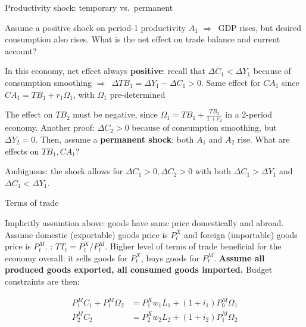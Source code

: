 \documentclass{beamer}
\newcommand{\tb}[1]{{\color{blue}{\textbf{#1}}}}
\newenvironment{mytemize}
{\vfill\itemize[nolistsep,itemsep=\fill,label=\color{blue}{$\triangleright$}]}
  {\enditemize}
\newcommand{\rarr}{$\Rightarrow$\ }
\begin{document}
\begin{frame}{%
\protect\hypertarget{productivity-shock-transitory-vs.permanent}{%
Productivity shock: temporary vs.~permanent}}

Assume a positive shock on period-1 productivity \(A_1\) \rarr GDP
rises, but desired consumption also rises. What is the net effect on
trade balance and current account?

\begin{mytemize}

\item
  In this economy, net effect always \textbf{positive}: recall that
  \(\Delta C_1 < \Delta Y_1\) because of consumption smoothing
  \rarr \(\Delta TB_1 = \Delta Y_1 - \Delta C_1 > 0\). Same effect for
  \(CA_1\) since \(CA_1 = TB_1 + r_1 \Omega_1\), with \(\Omega_1\)
  pre-determined
\item
  The effect on \(TB_2\) must be negative, since
  \(\Omega_1 = TB_1 + \frac{TB_2}{1+r_2}\) in a 2-period economy.
  Another proof: \(\Delta C_2 > 0\) because of consumption smoothing,
  but \(\Delta Y_2 = 0\).
\end{mytemize}
\vfill
Then, assume a \textbf{permanent shock}: both \(A_1\) and \(A_2\) rise.
What are effects on \(TB_1, CA_1\)?

\begin{mytemize}

\item
  Ambiguous: the shock allows for \(\Delta C_1 > 0, \Delta C_2 > 0\)
  with both \(\Delta C_1> \Delta Y_1\) and \(\Delta C_1< \Delta Y_1\).
\end{mytemize}

\end{frame}

\begin{frame}{%
\protect\hypertarget{terms-of-trade}{%
Terms of trade}}

Implicitly assumtion above: goods have same price
domestically and abroad. Assume domestic (exportable) goods price is \(P^X_t\)
 and foreign (importable) goods price is
\(P^M_t\).
\vfill
\tb{Terms of trade}:  \(TT_t = P^X_t/P^M_t\). Higher level
of terms of trade beneficial for the economy overall: it sells goods for
\(P^X_t\), buys goods for \(P^M_t\). \vfill \textbf{Assume all produced
goods exported, all consumed goods imported.} Budget constraints are
then:

\begin{align*}
     P^M_1 C_1 + P_1^M \Omega_2  &= P^X_1 w_1 \bar L_1 + (1+i_1) P_0^M \Omega_1  \\
     P^M_2 C_2 & =  P^X_2 w_2 L_2  + (1+i_2) P_1^M \Omega_2
  \end{align*} 
\end{frame}
\end{document}
